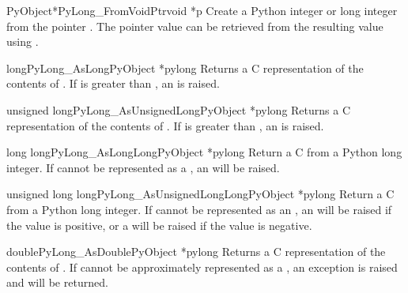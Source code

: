 \begin{cfuncdesc}{PyObject*}{PyLong_FromVoidPtr}{void *p}
  Create a Python integer or long integer from the pointer .
  The pointer value can be retrieved from the resulting value using
  .
\end{cfuncdesc}

\begin{cfuncdesc}{long}{PyLong_AsLong}{PyObject *pylong}
  Returns a C  representation of the contents of
  .  If  is greater than
  , an 
  is raised.
\end{cfuncdesc}

\begin{cfuncdesc}{unsigned long}{PyLong_AsUnsignedLong}{PyObject *pylong}
  Returns a C  representation of the contents of
  .  If  is greater than
  , an
   is raised.
\end{cfuncdesc}

\begin{cfuncdesc}{long long}{PyLong_AsLongLong}{PyObject *pylong}
  Return a C  from a Python long integer.  If
   cannot be represented as a , an
   will be raised.
\end{cfuncdesc}

\begin{cfuncdesc}{unsigned long long}{PyLong_AsUnsignedLongLong}{PyObject
                                                                 *pylong}
  Return a C  from a Python long integer.
  If  cannot be represented as an , an  will be raised if the value is
  positive, or a  will be raised if the value is
  negative.
\end{cfuncdesc}

\begin{cfuncdesc}{double}{PyLong_AsDouble}{PyObject *pylong}
  Returns a C  representation of the contents of
  .  If  cannot be approximately represented
  as a , an  exception is
  raised and  will be returned.
\end{cfuncdesc}

